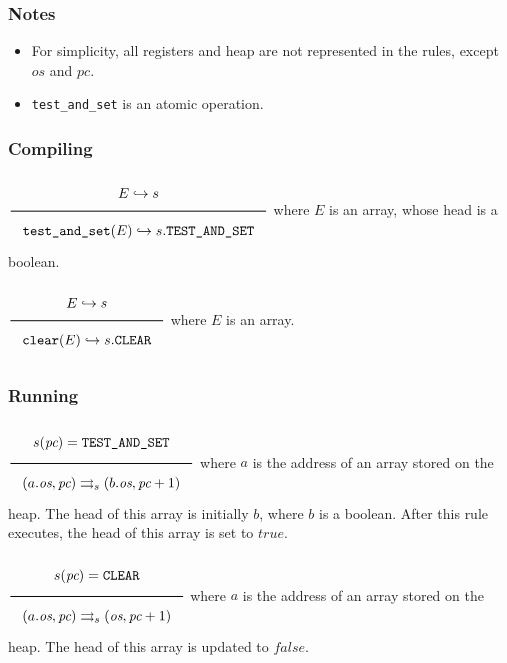 \subsubsection{Notes}
\label{sec:orgcccda22}
\begin{itemize}
\item For simplicity, all registers and heap are not represented in the rules, except \(\textit{os}\) and \(\textit{pc}\).
\item \texttt{test\_and\_set} is an atomic operation.
\end{itemize}

\subsubsection{Compiling}
\label{sec:org025d9fd}
\(\Rule{E \translateaux s}{\texttt{test\_and\_set}(E) \translateaux s.\texttt{TEST\_AND\_SET}}\\\)
where \(E\) is an array, whose head is a boolean.

\(\Rule{E \translateaux s}{\texttt{clear}(E) \translateaux s.\texttt{CLEAR}}\\\)
where \(E\) is an array.

\subsubsection{Running}
\label{sec:org6d01845}
\(\Rule{s(\textit{pc}) = \texttt{TEST\_AND\_SET}}{(a.\textit{os},\textit{pc}) \transition (b.\textit{os},\textit{pc} + 1)}\\\)
where \(a\) is the address of an array stored on the heap. The head of this array is initially \(b\), where \(b\) is a boolean. After this rule executes, the head of this array is set to \(\textit{true}\).

\(\Rule{s(\textit{pc}) = \texttt{CLEAR}}{(a.\textit{os},\textit{pc}) \transition (\textit{os},\textit{pc} + 1)}\\\)
where \(a\) is the address of an array stored on the heap. The head of this array is updated to \(\textit{false}\).
